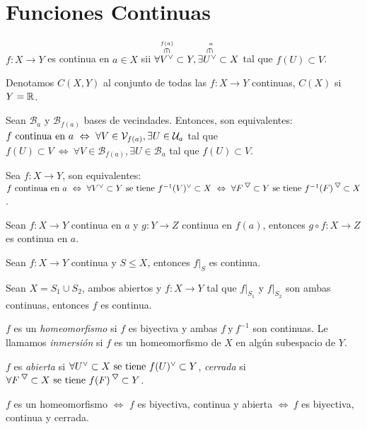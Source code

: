 \section*{Funciones Continuas}

\begin{definition}
    \(f: X \to Y \) es continua en \(a\in X \) sii \(\forall \overset{\overset{\text{$f(a)$}}{\rotatebox{-90}{$\in$}}}{V^\ab}\subset Y,\exists \overset{\overset{\text{ $a$}}{\rotatebox{-90}{$\in$}}}{U^\ab}\subset X\)  tal que \(f(U) \subset V \). 
\end{definition}
\begin{note}
    Denotamos \(C(X,Y)\) al conjunto de todas las \(f:X\to Y\) continuas, \(C(X)\) si \(Y=\mathbb{R}\). 
\end{note}
\newcommand{\B}{\mathcal{B}}
\begin{proposition}
   Sean \(\B_a\) y \(\B_{f(a)}\) bases de vecindades. Entonces, son equivalentes: \(f \text{ continua en } a \ \Leftrightarrow\   \forall V \in \V_{f(a)},\exists U \in \U_a\) tal que \(f(U)\subset V\ \Leftrightarrow\ \forall V \in \B_{f(a)}, \exists U \in \B_a\) tal que \(f(U)\subset V\). 
\end{proposition}
\begin{proposition}
   Sea \(f:X\to Y\), son equivalentes: \(f \text{ continua en } a \ \Leftrightarrow\  \forall V^\ab\subset Y \text{ se tiene } f^{-1}(V)^\ab \subset X \  \Leftrightarrow\ \forall F^\ce\subset Y \text{ se tiene }f^{-1}(F)^\ce\subset X \). 
\end{proposition}
\begin{proposition}
    Sean \(f:X\to Y\) continua en \(a\) y \(g:Y\to Z\) continua en \(f(a)\), entonces \(g\circ f:X\to Z\) es continua en \(a\). 
\end{proposition}
\begin{proposition}
    Sean \(f:X\to Y \) continua y \(S\leq X\), entonces \(f|_S\) es continua. 
\end{proposition}
\begin{proposition}
   Sean \(X = S_1\cup S_2\), ambos abiertos y \(f:X\to Y\) tal que \(f|_{S_1}\) y \(f|_{S_2}\) son ambas continuas, entonces \(f\) es continua. 
\end{proposition}
\begin{definition}
    \(f\) es un \emph{homeomorfismo} si \(f\) es biyectiva y ambas \(f\ \text{y}\ f^{-1}\) son continuas. Le llamamos \emph{inmersión} si \(f\) es un homeomorfismo de \(X\) en algún subespacio de \(Y\). 
\end{definition}
\begin{definition}
    \(f\) es \emph{abierta} si \(\forall U^\ab\subset X \text{ se tiene } f(U)^\ab\subset Y \), \emph{cerrada} si \(\forall F^\ce \subset X \text{ se tiene } f(F)^\ce\subset Y\). 
\end{definition}
\begin{proposition}
   \(f\) es un homeomorfismo \(\Leftrightarrow\) \(f\) es biyectiva, continua y abierta \(\Leftrightarrow \ f\) es biyectiva, continua y cerrada.  
\end{proposition}